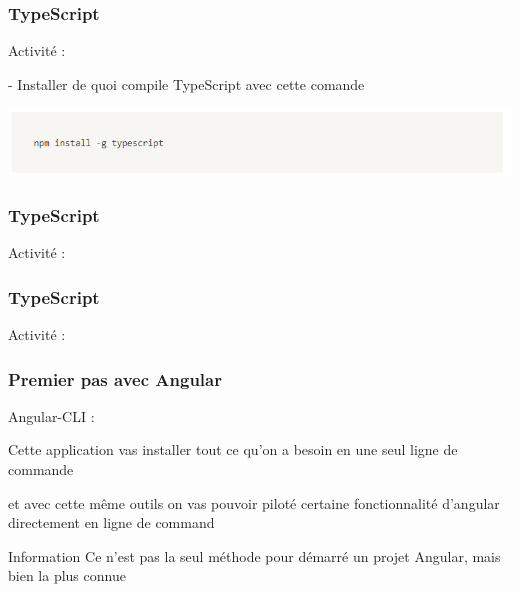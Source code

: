 \documentclass[10pt]{beamer}
\begin{document}
	\begin{frame}
		\frametitle{TypeScript}

		Activité : \newline \newline

		- Installer de quoi compile TypeScript avec cette comande \newline \newline

		\includegraphics[width=16cm]{assets/tsInstall}\newline


	\end{frame}

	\begin{frame}
		\frametitle{TypeScript}

		Activité : \newline \newline




	\end{frame}

	\begin{frame}
		\frametitle{TypeScript}

		Activité : \newline \newline




	\end{frame}


	\begin{frame}
		\frametitle{Premier pas avec Angular}

		Angular-CLI :  \newline \newline

		\centering
		Cette application vas installer tout ce qu’on a besoin \newline en une seul ligne de commande  \newline \newline

		et avec cette même outils on vas pouvoir piloté certaine fonctionnalité d’angular directement en ligne de command  \newline \newline

		\begin{block}{Information}
			Ce n'est pas la seul méthode pour démarré un projet Angular, mais bien la plus connue
		\end{block}

	\end{frame}
\end{document}
